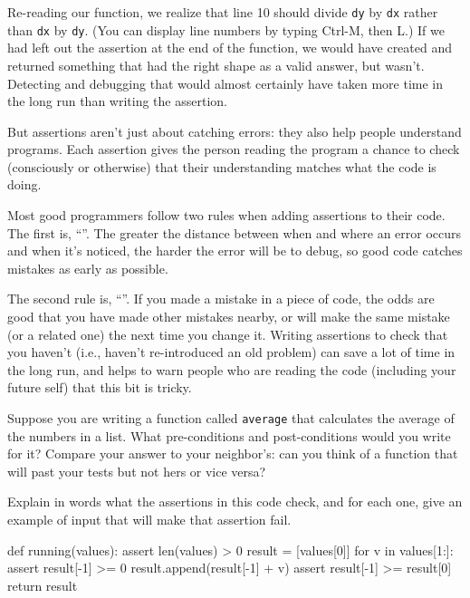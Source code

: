 Re-reading our function, we realize that line 10 should divide
\texttt{dy} by \texttt{dx} rather than \texttt{dx} by \texttt{dy}. (You
can display line numbers by typing Ctrl-M, then L.) If we had left out
the assertion at the end of the function, we would have created and
returned something that had the right shape as a valid answer, but
wasn't. Detecting and debugging that would almost certainly have taken
more time in the long run than writing the assertion.

But assertions aren't just about catching errors: they also help people
understand programs. Each assertion gives the person reading the program
a chance to check (consciously or otherwise) that their understanding
matches what the code is doing.

Most good programmers follow two rules when adding assertions to their
code. The first is, ``''. The greater the distance between when and where an
error occurs and when it's noticed, the harder the error will be to
debug, so good code catches mistakes as early as possible.

The second rule is,
``''. If you made a mistake in a piece of code,
the odds are good that you have made other mistakes nearby, or will make
the same mistake (or a related one) the next time you change it. Writing
assertions to check that you haven't 
(i.e., haven't re-introduced an old problem) can save a lot of time in
the long run, and helps to warn people who are reading the code
(including your future self) that this bit is tricky.

\begin{challenge}
  Suppose you are writing a function called \texttt{average} that
  calculates the average of the numbers in a list. What pre-conditions
  and post-conditions would you write for it? Compare your answer to
  your neighbor's: can you think of a function that will past your tests
  but not hers or vice versa?
\end{challenge}

\begin{challenge}
  Explain in words what the assertions in this code check, and for each
  one, give an example of input that will make that assertion fail.

\begin{VerbIn}
def running(values):
    assert len(values) > 0
    result = [values[0]]
    for v in values[1:]:
        assert result[-1] >= 0
        result.append(result[-1] + v)
    assert result[-1] >= result[0]
    return result
\end{VerbIn}
\end{challenge}

